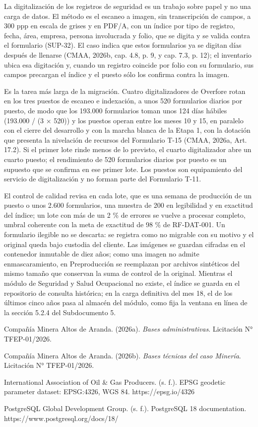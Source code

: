 \documentclass[anexo]{../../comun/overfore}
\begin{document}
La digitalización de los registros de seguridad es un trabajo sobre papel y no una carga de datos. El método es el escaneo a imagen, sin transcripción de campos, a 300 ppp en escala de grises y en PDF/A, con un índice por tipo de registro, fecha, área, empresa, persona involucrada y folio, que se digita y se valida contra el formulario (SUP-32). El caso indica que estos formularios ya se digitan días después de llenarse (CMAA, 2026b, cap. 4.8, p. 9, y cap. 7.3, p. 12); el inventario ubica esa digitación y, cuando un registro coincide por folio con su formulario, sus campos precargan el índice y el puesto sólo los confirma contra la imagen.

Es la tarea más larga de la migración. Cuatro digitalizadores de Overfore rotan en los tres puestos de escaneo e indexación, a unos 520 formularios diarios por puesto, de modo que los 193.000 formularios toman unos 124 días hábiles (193.000 / (3 × 520)) y los puestos operan entre los meses 10 y 15, en paralelo con el cierre del desarrollo y con la marcha blanca de la Etapa 1, con la dotación que presenta la nivelación de recursos del Formulario T-15 (CMAA, 2026a, Art. 17.2). Si el primer lote rinde menos de lo previsto, el cuarto digitalizador abre un cuarto puesto; el rendimiento de 520 formularios diarios por puesto es un supuesto que se confirma en ese primer lote. Los puestos son equipamiento del servicio de digitalización y no forman parte del Formulario T-11.

El control de calidad revisa en cada lote, que es una semana de producción de un puesto o unos 2.600 formularios, una muestra de 200 en legibilidad y en exactitud del índice; un lote con más de un 2 \% de errores se vuelve a procesar completo, umbral coherente con la meta de exactitud de 98 \% de RF-DAT-001. Un formulario ilegible no se descarta: se registra como no migrable con su motivo y el original queda bajo custodia del cliente. Las imágenes se guardan cifradas en el contenedor inmutable de diez años; como una imagen no admite enmascaramiento, en Preproducción se reemplazan por archivos sintéticos del mismo tamaño que conservan la suma de control de la original. Mientras el módulo de Seguridad y Salud Ocupacional no existe, el índice se guarda en el repositorio de consulta histórica; en la carga definitiva del mes 18, el de los últimos cinco años pasa al almacén del módulo, como fija la ventana en línea de la sección 5.2.4 del Subdocumento 5.

\begin{referencias}
\item Compañía Minera Altos de Aranda. (2026a). \emph{Bases administrativas}. Licitación N° TFEP-01/2026.
\item Compañía Minera Altos de Aranda. (2026b). \emph{Bases técnicas del caso Minería}. Licitación N° TFEP-01/2026.
\item International Association of Oil \& Gas Producers. (s. f.). EPSG geodetic parameter dataset: EPSG:4326, WGS 84. https://epsg.io/4326
\item PostgreSQL Global Development Group. (s. f.). PostgreSQL 18 documentation. https://www.postgresql.org/docs/18/
\end{referencias}
\end{document}
